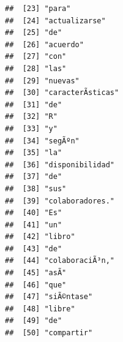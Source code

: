 \documentclass[
]{book}
\begin{document}
\begin{verbatim}
##  [23] "para"                                                                             
##  [24] "actualizarse"                                                                     
##  [25] "de"                                                                               
##  [26] "acuerdo"                                                                          
##  [27] "con"                                                                              
##  [28] "las"                                                                              
##  [29] "nuevas"                                                                           
##  [30] "caracterÃ­sticas"                                                                 
##  [31] "de"                                                                               
##  [32] "R"                                                                                
##  [33] "y"                                                                                
##  [34] "segÃºn"                                                                           
##  [35] "la"                                                                               
##  [36] "disponibilidad"                                                                   
##  [37] "de"                                                                               
##  [38] "sus"                                                                              
##  [39] "colaboradores."                                                                   
##  [40] "Es"                                                                               
##  [41] "un"                                                                               
##  [42] "libro"                                                                            
##  [43] "de"                                                                               
##  [44] "colaboraciÃ³n,"                                                                   
##  [45] "asÃ­"                                                                             
##  [46] "que"                                                                              
##  [47] "siÃ©ntase"                                                                        
##  [48] "libre"                                                                            
##  [49] "de"                                                                               
##  [50] "compartir"                                                                        

\end{verbatim}
\end{document}
